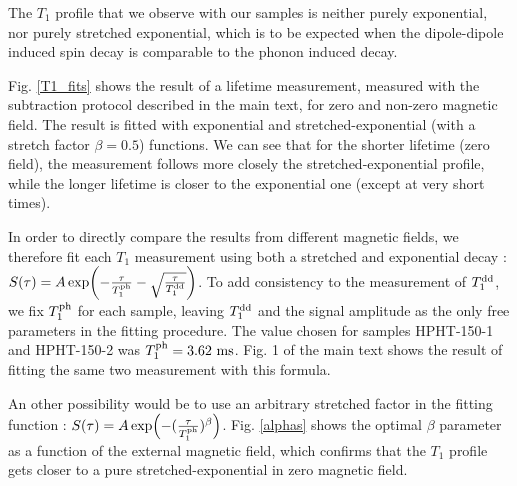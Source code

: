 \documentclass[preprintnumbers,amsmath,amssymb,onecolumn,12pt]{revtex4-2}\usepackage{graphicx}%
\begin{document}
The $T_1$ profile that we observe with our samples is neither purely exponential, nor purely stretched exponential, which is to be expected when the dipole-dipole induced spin decay is comparable to the phonon induced decay.

Fig. \ref{T1_fits} shows the result of a lifetime measurement, measured with the subtraction protocol described in the main text, for zero and non-zero magnetic field. The result is fitted with exponential and stretched-exponential (with a stretch factor $\beta=0.5$) functions. We can see that for the shorter lifetime (zero field), the measurement follows more closely the stretched-exponential profile, while the longer lifetime is closer to the exponential one (except at very short times).

In order to directly compare the results from different magnetic fields, we therefore fit each $T_1$ measurement using both a stretched and exponential decay : $S(\tau)=A \exp (-\frac{\tau}{T_1^{\rm ph}} -\sqrt{\frac{\tau}{T_1^{\rm dd}}})$.
To add consistency to the measurement of $T_1^{\rm dd}$, we fix $T_1^{\rm ph}$ for each sample, leaving $T_1^{\rm dd}$ and the signal amplitude as the only free parameters in the fitting procedure. The value chosen for samples HPHT-150-1 and HPHT-150-2 was $T_1^{\rm ph}=3.62\ \rm ms$. Fig. 1 of the main text shows the result of fitting the same two measurement with this formula.

An other possibility would be to use an arbitrary stretched factor in the fitting function : $S(\tau)=A \exp (-(\frac{\tau}{T_1^{\rm ph}})^\beta )$. Fig. \ref{alphas} shows the optimal $\beta$ parameter as a function of the external magnetic field, which confirms that the $T_1$ profile gets closer to a pure stretched-exponential in zero magnetic field.
\end{document}
